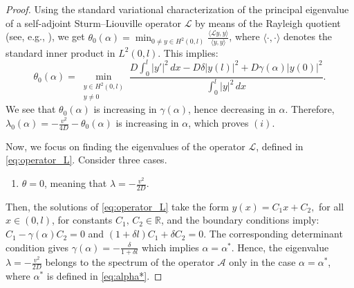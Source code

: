 \documentclass[10pt,a4paper]{amsart}
\begin{document}
\begin{proof}
Using the standard variational characterization of the principal eigenvalue of a self-adjoint Sturm--Liouville operator $\mathcal{L}$ by means of the Rayleigh quotient (see, e.g., \cite{Zet2005}), we get $\theta_0(\alpha)=\min_{0\neq y\in H^2(0,l)}\frac{\langle\mathcal{L}y,y\rangle}{\langle y,y\rangle}$, where $\langle\cdot,\cdot\rangle$ denotes the standard inner product in $L^2(0,l)$. This implies:
\begin{equation*}
\theta_0(\alpha)=\min_{\substack{y\in H^2(0,l)\\ y\neq 0}}\frac{D\int_0^l |y'|^2\,dx - D\delta |y(l)|^2 + D\gamma(\alpha)|y(0)|^2}
{\int_0^l |y|^2\,dx}.
\end{equation*}
We see that $\theta_0(\alpha)$ is increasing in $\gamma(\alpha)$, hence decreasing in $\alpha$.
Therefore, $\lambda_0(\alpha) = -\frac{v^2}{4D} - \theta_0(\alpha)$ is increasing in $\alpha$, which proves $(i)$.

Now, we focus on finding the eigenvalues of the operator $\mathcal{L}$, defined in \eqref{eq:operator_L}. Consider three cases.
\begin{enumerate}
    \item[1)] $\theta=0$, meaning that $\lambda=-\frac{v^2}{2D}$.
\end{enumerate}
Then, the solutions of \eqref{eq:operator_L} take the form
$y(x)=C_1x+C_2,$ 
for all $x \in (0,l)$,
for constants $C_1,\,C_2\in\mathbb{R}$,
and the boundary conditions imply:
$C_1-\gamma(\alpha)C_2=0$ and
$(1+\delta l)C_1+\delta C_2=0$.
The corresponding determinant condition gives $\gamma(\alpha)=-\frac{\delta}{1+\delta l}$ which implies $\alpha=\alpha^*$. Hence, the eigenvalue $\lambda=-\frac{v^2}{2D}$ belongs to the spectrum of the operator $\mathcal{A}$ only in the case $\alpha=\alpha^*$, where $\alpha^*$ is defined in \eqref{eq:alpha*}.


\end{proof}
\end{document}
